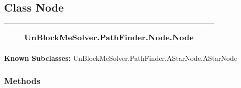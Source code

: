 \subsection{Class Node}

    \label{UnBlockMeSolver:PathFinder:Node:Node}
\begin{tabular}{cccccc}
\multicolumn{2}{r}{\settowidth{\BCL}{object}\multirow{2}{\BCL}{object}}
&&
  \\\cline{3-3}
  &&\multicolumn{1}{c|}{}
&&
  \\
&&\multicolumn{2}{l}{\textbf{UnBlockMeSolver.PathFinder.Node.Node}}
\end{tabular}

\textbf{Known Subclasses:} UnBlockMeSolver.PathFinder.AStarNode.AStarNode



  \subsubsection{Methods}

    \vspace{0.5ex}

